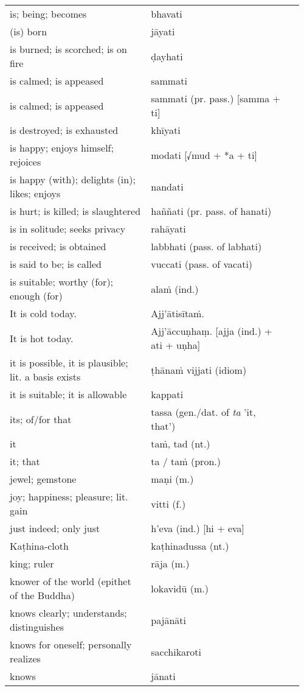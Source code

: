 \documentclass[a5paper]{memoir}
\begin{document}
\begin{longtable}{L{0.48\linewidth} L{0.48\linewidth} H}
is; being; becomes & bhavati & \\
(is) born & jāyati & \\
is burned; is scorched; is on fire & ḍayhati & \\
is calmed; is appeased & sammati & \\
is calmed; is appeased & sammati (pr. pass.) [samma + ti] & \\
is destroyed; is exhausted & khīyati & \\
is happy; enjoys himself; rejoices & modati [√mud + *a + ti] & \\
is happy (with); delights (in); likes; enjoys & nandati & \\
is hurt; is killed; is slaughtered & haññati (pr. pass. of hanati) & \\
is in solitude; seeks privacy & rahāyati & \\
is received; is obtained & labbhati (pass. of labhati) & \\
is said to be; is called & vuccati (pass. of vacati) & \\
is suitable; worthy (for); enough (for) & alaṁ (ind.) & \\
It is cold today. & Ajj'ātisītaṁ. & \\
It is hot today. & Ajj'āccuṇhaṃ. [ajja (ind.) + ati  + uṇha] & \\
it is possible, it is plausible; lit. a basis exists & ṭhānaṁ vijjati (idiom) & \\
it is suitable; it is allowable & kappati & \\
its; of/for that & tassa (gen./dat. of \emph{ta} 'it, that') & \\
it & taṁ, tad (nt.) & \\
it; that & ta / taṁ (pron.) & \\
jewel; gemstone & maṇi (m.) & \\
joy; happiness; pleasure; lit. gain & vitti (f.) & \\
just indeed; only just & h'eva (ind.) [hi + eva] & \\
Kaṭhina-cloth & kaṭhinadussa (nt.) & \\
king; ruler & rāja (m.) & \\
knower of the world (epithet of the Buddha) & lokavidū (m.) & \\
knows clearly; understands; distinguishes & pajānāti & \\
knows for oneself; personally realizes & sacchikaroti & \\
knows & jānati & \\

\end{longtable}
\end{document}
